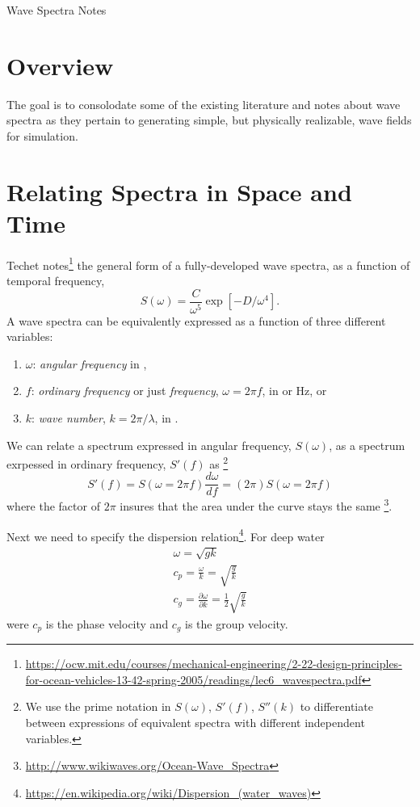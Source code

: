 \documentclass[11pt]{article}
\newcommand{\proposaltitle}{Wave Spectra Notes}
\begin{document}
\newpage
\setcounter{page}{1}
\begin{center}
{\huge \proposaltitle}
\end{center}

\section{Overview}
The goal is to consolodate some of the existing literature and notes about wave spectra as they pertain to generating simple, but physically realizable, wave fields for simulation.

\section{Relating Spectra in Space and Time}
Techet notes\footnote{\url{https://ocw.mit.edu/courses/mechanical-engineering/2-22-design-principles-for-ocean-vehicles-13-42-spring-2005/readings/lec6_wavespectra.pdf}} the general form of a fully-developed wave spectra, as a function of temporal frequency,
\begin{equation}
S(\omega) = \frac{C}{\omega^5} \exp{\left[ -D/\omega^4 \right]}.
\label{e:form}
\end{equation}
A wave spectra can be equivalently expressed as a function of three different variables:
\begin{enumerate}
\item $\omega$: \emph{angular frequency} in ,
\item $f$: \emph{ordinary frequency} or just \emph{frequency}, $\omega=2 \pi f$, in  or \unit[]{Hz}, or
\item $k$: \emph{wave number}, $k = 2 \pi/\lambda$, in .
\end{enumerate}

We can relate a spectrum expressed in angular frequency, $S(\omega)$, as a spectrum exrpessed in ordinary frequency, $S'(f)$ as \footnote{We use the prime notation  in $S(\omega)$, $S'(f)$, $S''(k)$ to differentiate between expressions of equivalent spectra with different independent variables.}
\begin{equation} S'(f) = S(\omega=2 \pi f) \frac{d\omega}{df} = (2 \pi) S(\omega=2 \pi f)\end{equation}
where the factor of $2 \pi$ insures that the area under the curve stays the same \footnote{\url{http://www.wikiwaves.org/Ocean-Wave_Spectra}}.

Next we need to specify the dispersion relation\footnote{\url{https://en.wikipedia.org/wiki/Dispersion_(water_waves)}}.  For deep water 
\begin{eqnarray}
\omega = \sqrt{gk} \\
c_p = \frac{\omega}{k}=\sqrt{\frac{g}{k}} \\
c_g = \frac{\partial \omega}{\partial k} = \frac{1}{2} \sqrt{\frac{g}{k}}
\end{eqnarray}
were $c_p$ is the phase velocity and $c_g$ is the group velocity.
\end{document}
